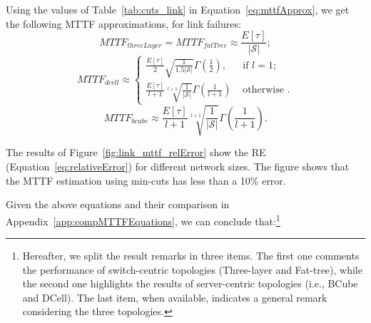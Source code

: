 Using the values of Table~\ref{tab:cuts_link} in Equation~\ref{eq:mttfApprox}, we get the following MTTF approximations, for link failures:
\begin{equation}
MTTF_{threeLayer} = MTTF_{fatTree} \approx \frac{E[\tau]}{|\mathcal{S}|};
\label{mttf_fatTree_link}
\end{equation}
\begin{equation}
    MTTF_{dcell} \approx \begin{cases}
               \frac{E[\tau]}{2}\sqrt{\frac{1}{1.5|\mathcal{S}|}} \Gamma \left (  \frac{1}{2} \right ),   &\text{ if }          l = 1;\\
               \frac{E[\tau]}{l+1}\sqrt[l+1]{\frac{1}{|\mathcal{S}|}} \Gamma \left (  \frac{1}{l+1} \right ) &\text{ otherwise }.
           \end{cases}
\end{equation}
\begin{equation}
	MTTF_{bcube} \approx \frac{E[\tau]}{l+1}\sqrt[l+1]{\frac{1}{|\mathcal{S}|}} \Gamma \left (  \frac{1}{l+1} \right ).
\end{equation}

The results of Figure~\ref{fig:link_mttf_relError} show the RE (Equation~\ref{eq:relativeError}) for different network sizes. The figure shows that the MTTF estimation using min-cuts has less than a 10\% error.

Given the above equations and their comparison in Appendix~\ref{app:compMTTFEquations}, we can conclude that:\footnote{Hereafter, we split the result remarks in three items. The first one comments the performance of switch-centric topologies (Three-layer and Fat-tree), while the second one highlights the results of server-centric topologies (i.e., BCube and DCell). The last item, when available, indicates a general remark considering the three topologies.}


